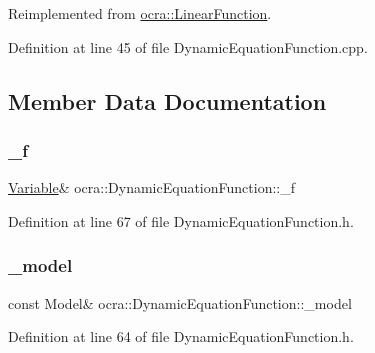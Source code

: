 Reimplemented from \hyperlink{classocra_1_1LinearFunction_a30926f977c0124a0b0f65b854ab39636}{ocra\+::\+Linear\+Function}.



Definition at line 45 of file Dynamic\+Equation\+Function.\+cpp.



\subsection{Member Data Documentation}
\hypertarget{classocra_1_1DynamicEquationFunction_a70499af5c86e68836acb7251b37ab668}{}\label{classocra_1_1DynamicEquationFunction_a70499af5c86e68836acb7251b37ab668} 
\subsubsection{\texorpdfstring{\+\_\+f}{\_f}}
{\footnotesize\ttfamily \hyperlink{classocra_1_1Variable}{Variable}\& ocra\+::\+Dynamic\+Equation\+Function\+::\+\_\+f\hspace{0.3cm}{\ttfamily [protected]}}



Definition at line 67 of file Dynamic\+Equation\+Function.\+h.

\hypertarget{classocra_1_1DynamicEquationFunction_ad0c5d639974a97aa3ed3f0bbe0f8189d}{}\label{classocra_1_1DynamicEquationFunction_ad0c5d639974a97aa3ed3f0bbe0f8189d} 
\subsubsection{\texorpdfstring{\+\_\+model}{\_model}}
{\footnotesize\ttfamily const Model\& ocra\+::\+Dynamic\+Equation\+Function\+::\+\_\+model\hspace{0.3cm}{\ttfamily [protected]}}



Definition at line 64 of file Dynamic\+Equation\+Function.\+h.

\hypertarget{classocra_1_1DynamicEquationFunction_a8a6dfb64fcca3c42a9e7ad637706a6cc}{}\label{classocra_1_1DynamicEquationFunction_a8a6dfb64fcca3c42a9e7ad637706a6cc} 
